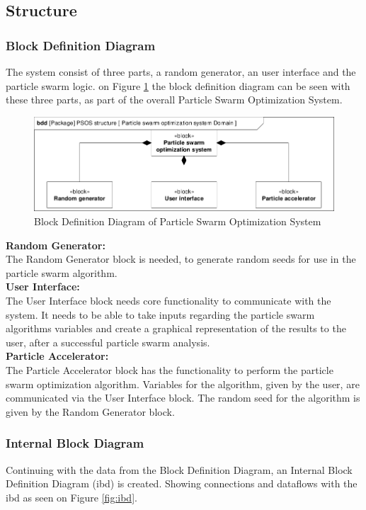 \subsection{Structure} \label{requirementspecification:Structure}

\subsubsection{Block Definition Diagram}
The system consist of three parts, a random generator, an user interface and the particle swarm logic. on Figure \ref{fig:bdd} the block definition diagram can be seen with these three parts, as part of the overall Particle Swarm Optimization System.

\begin{figure}[!h]
	\centering
	\includegraphics[width=0.8\linewidth]{diagram/bdd_particle_swarm_optimization_system.pdf}
	\caption{Block Definition Diagram of Particle Swarm Optimization System}
	\label{fig:bdd}
\end{figure}

\textbf{Random Generator:}\\
The Random Generator block is needed, to generate random seeds for use in the particle swarm algorithm.\\

\textbf{User Interface:}\\
The User Interface block needs core functionality to communicate with the system. It needs to be able to take inputs regarding the particle swarm algorithms variables and create a graphical representation of the results to the user, after a successful particle swarm analysis.\\

\textbf{Particle Accelerator:}\\
The Particle Accelerator block has the functionality to perform the particle swarm optimization algorithm. Variables for the algorithm, given by the user, are communicated via the User Interface block. The random seed for the algorithm is given by the Random Generator block.

\subsubsection{Internal Block Diagram}
Continuing with the data from the Block Definition Diagram, an Internal Block Definition Diagram (ibd) is created. Showing connections and dataflows with the ibd as seen on Figure \ref{fig:ibd}.

